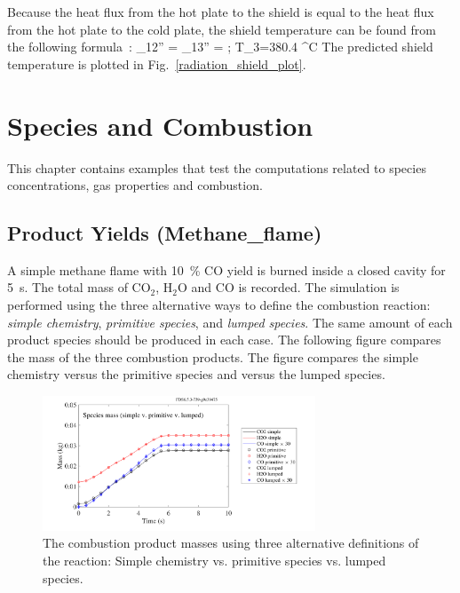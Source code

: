\documentclass[11pt]{book}
\begin{document}
Because the heat flux from the hot plate to the shield is equal to the heat flux from the hot plate to the cold plate,
the shield temperature can be found from the following formula~\cite{Incropera:1}:
\be
   \dq_{12}'' = \dq_{13}'' =  \quad ; \quad T_3=380.4 \; ^\circ\hbox{C}
\ee
The predicted shield temperature is plotted in Fig.~\ref{radiation_shield_plot}.




\chapter{Species and Combustion}

This chapter contains examples that test the computations related to species concentrations, gas properties and combustion.



\section{Product Yields (Methane\_flame)}

A simple methane flame with 10~\% CO yield is burned inside a closed cavity for 5~s.
The total mass of CO$_2$, H$_2$O and CO is recorded.
The simulation is performed using the three alternative ways
to define the combustion reaction: {\em simple chemistry}, {\em primitive species}, and {\em lumped species}. The
same amount of each product species should be produced in each case. The following figure compares the
mass of the three combustion products. The figure compares the simple chemistry versus the primitive species and versus the lumped species.
\begin{figure}[ht]
\begin{center}
\includegraphics[width=3.2in]{SCRIPT_FIGURES/Methane_flame_reac_comp}
\caption[Yield of combustion products using three alternative definitions of the same reaction.]{The combustion product masses using three alternative definitions of the reaction:  Simple chemistry vs. primitive species vs. lumped species. }
\label{fig_methane_flame_yields}
\end{center}
\end{figure}
\end{document}
